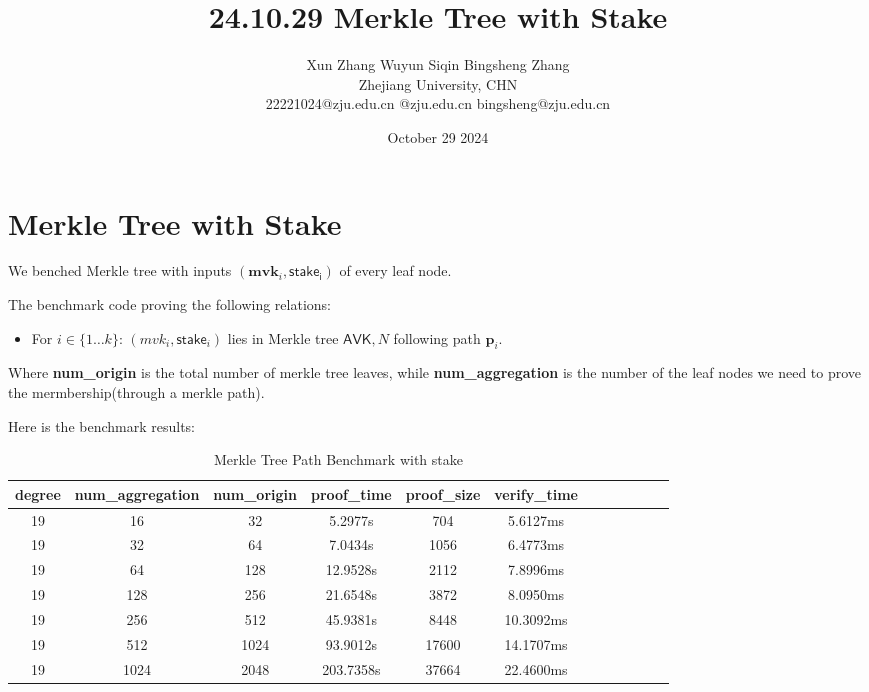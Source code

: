 \documentclass{article}
\title{24.10.29 Merkle Tree with Stake}
\author{Xun Zhang \quad \quad Wuyun Siqin \quad \quad Bingsheng Zhang \\ 
Zhejiang University, CHN \\
22221024@zju.edu.cn \quad 3210101763@zju.edu.cn \quad bingsheng@zju.edu.cn}
\date{October 29 2024}
\begin{document}
\maketitle

\section{Merkle Tree with Stake}


We benched Merkle tree with inputs $(\mathbf{mvk}_i, \mathsf{stake_i})$ of every leaf node.


The benchmark code proving the following relations:

\begin{itemize}
        \item For $i \in \{1 \dots k\}$: $(mvk_i, \mathsf{stake}_i)$ lies in Merkle tree $\mathsf{AVK}, N$ following path $\bm{p}_i$.
\end{itemize}



Where \textbf{num\_origin} is the total number of merkle tree leaves, while \textbf{num\_aggregation} is the number of the leaf nodes we need to prove the mermbership(through a merkle path).



Here is the benchmark results:
\begin{table}[h!]
\centering
\begin{tabular}{|c|c|c|c|c|c|c|c|c|c|c|c|}
\hline
\textbf{degree}    & \textbf{num\_aggregation} & \textbf{num\_origin} & \textbf{proof\_time} & \textbf{proof\_size} & \textbf{verify\_time} \\ \hline
19   & 16 & 32 & 5.2977s & 704 & 5.6127ms \\ \hline
19   & 32 & 64 & 7.0434s & 1056 & 6.4773ms \\ \hline
19    & 64 & 128 & 12.9528s & 2112 & 7.8996ms \\ \hline
19   & 128 & 256 & 21.6548s & 3872 & 8.0950ms \\ \hline
19   & 256 & 512 & 45.9381s & 8448 & 10.3092ms \\ \hline
19    & 512 & 1024 & 93.9012s & 17600 & 14.1707ms \\ \hline
19    & 1024 & 2048 & 203.7358s & 37664 & 22.4600ms \\ \hline
\end{tabular}
\caption{Merkle Tree Path Benchmark with stake}
\label{tab:data_table}
\end{table}
\end{document}
